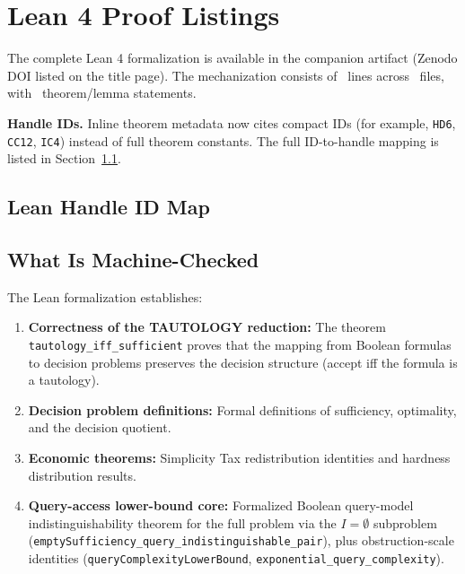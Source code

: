\section{Lean 4 Proof Listings}\label{app:lean}

The complete Lean 4 formalization is available in the companion artifact (Zenodo DOI listed on the title page). The mechanization consists of \LeanTotalLines\ lines across \LeanTotalFiles\ files, with \LeanTotalTheorems\ theorem/lemma statements.

\noindent\textbf{Handle IDs.} Inline theorem metadata now cites compact IDs (for example, \texttt{HD6}, \texttt{CC12}, \texttt{IC4}) instead of full theorem constants. The full ID-to-handle mapping is listed in Section~\ref{sec:lean-handle-id-map}.

\subsection{Lean Handle ID Map}\label{sec:lean-handle-id-map}

\subsection{What Is Machine-Checked}

The Lean formalization establishes:

\begin{enumerate}
\item \textbf{Correctness of the TAUTOLOGY reduction:} The theorem \texttt{tautology\_iff\_sufficient} proves that the mapping from Boolean formulas to decision problems preserves the decision structure (accept iff the formula is a tautology).

\item \textbf{Decision problem definitions:} Formal definitions of sufficiency, optimality, and the decision quotient.

\item \textbf{Economic theorems:} Simplicity Tax redistribution identities and hardness distribution results.

\item \textbf{Query-access lower-bound core:} Formalized Boolean query-model indistinguishability theorem for the full problem via the $I=\emptyset$ subproblem (\texttt{emptySufficiency\_query\_indistinguishable\_pair}), plus obstruction-scale identities (\texttt{queryComplexityLowerBound}, \texttt{exponential\_query\_complexity}).
\end{enumerate}

